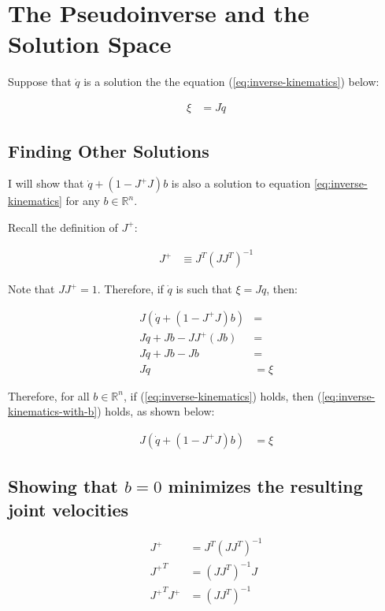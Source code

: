 \documentclass{article}
\begin{document}
\section{The Pseudoinverse and the Solution Space}
Suppose that $\dot{q}$ is a solution the the equation (\ref{eq:inverse-kinematics}) below:

\begin{align}
	\xi & = J \dot{q} \label{eq:inverse-kinematics}
\end{align}

\subsection{Finding Other Solutions}

I will show that $\dot{q} + \left( 1 - J^+J \right) b$ is also a solution to
	equation \ref{eq:inverse-kinematics} for any $b \in \mathbb{R}^n$.

Recall the definition of $J^+$:

\begin{align}
	J^+ & \equiv J^T (J J^T)^{-1}
\end{align}

Note that $J J^+ = 1$.
Therefore, if $\dot{q}$ is such that $\xi = J \dot{q}$, then:

\begin{align}
	J \left( \dot{q} + \left( 1 - J^+J \right) b \right) & = \nonumber \\
	J \dot{q} + J b - J J^+ (J b) & = \nonumber \\
	J \dot{q} + J b - J b & = \nonumber \\
	J \dot{q} & = \xi \nonumber
\end{align}

Therefore, for all $b \in \mathbb{R}^n$, if (\ref{eq:inverse-kinematics}) holds,
	then (\ref{eq:inverse-kinematics-with-b}) holds, as shown below:

\begin{align}
	J \left( \dot{q} + (1 - J^+ J ) b \right) & = \xi 
		\label{eq:inverse-kinematics-with-b}
\end{align}

\subsection{Showing that $b = 0$ minimizes the resulting joint velocities}

\begin{align}
J^+ & = J^T (J J^T)^{-1} \\
{J^+}^T & = (J J^T)^{-1} J \\
{J^+ }^T J^+ & = (J J^T)^{-1} 
\end{align}
\end{document}
